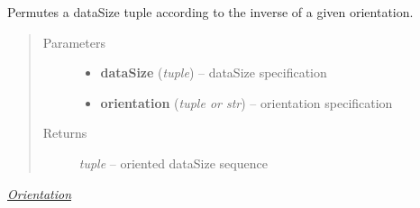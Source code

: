 \documentclass[letterpaper,10pt,english]{sphinxmanual}
\begin{document}

\begin{fulllineitems}
\label{api/ClearMap.Alignment:ClearMap.Alignment.Resampling.orientDataSizeInverse}
Permutes a dataSize tuple according to the inverse of a given orientation.
\begin{quote}\begin{description}
\item[{Parameters}] \leavevmode\begin{itemize}
\item {} 
\textbf{dataSize} (\emph{tuple}) --
dataSize specification

\item {} 
\textbf{orientation} (\emph{tuple or str}) --
orientation specification

\end{itemize}

\item[{Returns}] \leavevmode
\emph{tuple} --
oriented dataSize sequence

\end{description}\end{quote}




{\hyperref[api/ClearMap.Alignment:orientation]{\emph{Orientation}}}



\end{fulllineitems}

\end{document}
